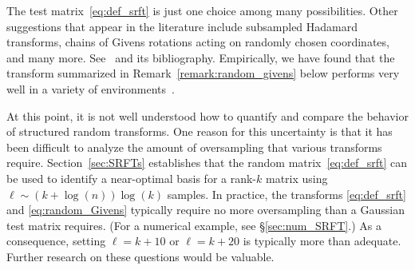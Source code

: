 \documentclass{article}
\begin{document}
The test matrix~\eqref{eq:def_srft} is just one choice among many
possibilities.  Other suggestions that appear in the literature include
subsampled Hadamard transforms, chains of Givens rotations acting on
randomly chosen coordinates, and many more.  See~\cite{liberty_diss}
and its bibliography.  Empirically, we have found that the transform
summarized in Remark~\ref{remark:random_givens} below performs very
well in a variety of environments~\cite{2008_rokhlin_leastsquares}.

At this point, it is not well understood how to quantify and compare
the behavior of structured random transforms.  One reason for this
uncertainty is that it has been difficult to analyze the amount
of oversampling that various transforms require.  Section~\ref{sec:SRFTs}
establishes that the random matrix~\eqref{eq:def_srft} can be used to
identify a near-optimal basis for a rank-$k$ matrix using
$\ell \sim (k + \log(n)) \log(k)$ samples.
%
%
In practice, the transforms \eqref{eq:def_srft} and \eqref{eq:random_Givens}
typically require no more oversampling than a Gaussian test matrix requires.
(For a numerical example, see \S\ref{sec:num_SRFT}.)
As a consequence, setting $\ell = k + 10$ or $\ell = k + 20$ is typically more than
adequate. Further research on these questions would be valuable.

\lsp
\end{document}
